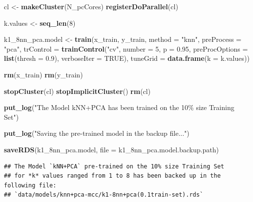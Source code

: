 \documentclass[
]{report}
\newenvironment{Shaded}{\begin{snugshade}}{\end{snugshade}}
\newcommand{\AttributeTok}[1]{\textcolor[rgb]{0.13,0.29,0.53}{#1}}
\newcommand{\ConstantTok}[1]{\textcolor[rgb]{0.56,0.35,0.01}{#1}}
\newcommand{\DecValTok}[1]{\textcolor[rgb]{0.00,0.00,0.81}{#1}}
\newcommand{\FloatTok}[1]{\textcolor[rgb]{0.00,0.00,0.81}{#1}}
\newcommand{\FunctionTok}[1]{\textcolor[rgb]{0.13,0.29,0.53}{\textbf{#1}}}
\newcommand{\NormalTok}[1]{#1}
\newcommand{\OtherTok}[1]{\textcolor[rgb]{0.56,0.35,0.01}{#1}}
\newcommand{\StringTok}[1]{\textcolor[rgb]{0.31,0.60,0.02}{#1}}
\begin{document}
\begin{Shaded}
\begin{Highlighting}[]
\NormalTok{cl }\OtherTok{\textless{}{-}} \FunctionTok{makeCluster}\NormalTok{(N\_pcCores)}
\FunctionTok{registerDoParallel}\NormalTok{(cl)}

\NormalTok{k.values }\OtherTok{\textless{}{-}} \FunctionTok{seq\_len}\NormalTok{(}\DecValTok{8}\NormalTok{)}

\NormalTok{k1\_8nn\_pca.model }\OtherTok{\textless{}{-}} 
  \FunctionTok{train}\NormalTok{(x\_train, }
\NormalTok{        y\_train, }
        \AttributeTok{method =} \StringTok{"knn"}\NormalTok{, }
        \AttributeTok{preProcess =} \StringTok{"pca"}\NormalTok{,}
        \AttributeTok{trControl =} \FunctionTok{trainControl}\NormalTok{(}\StringTok{"cv"}\NormalTok{, }
                                 \AttributeTok{number =} \DecValTok{5}\NormalTok{, }
                                 \AttributeTok{p =} \FloatTok{0.95}\NormalTok{,}
                                 \AttributeTok{preProcOptions =} \FunctionTok{list}\NormalTok{(}\AttributeTok{thresh =} \FloatTok{0.9}\NormalTok{),}
                                 \AttributeTok{verboseIter =} \ConstantTok{TRUE}\NormalTok{),}
        \AttributeTok{tuneGrid =} \FunctionTok{data.frame}\NormalTok{(}\AttributeTok{k =}\NormalTok{ k.values))}

\FunctionTok{rm}\NormalTok{(x\_train)}
\FunctionTok{rm}\NormalTok{(y\_train)}

\FunctionTok{stopCluster}\NormalTok{(cl)}
\FunctionTok{stopImplicitCluster}\NormalTok{()}
\FunctionTok{rm}\NormalTok{(cl)}

\FunctionTok{put\_log}\NormalTok{(}\StringTok{"The Model \textasciigrave{}kNN+PCA\textasciigrave{} has been trained on the 10\% size Training Set"}\NormalTok{)}

\FunctionTok{put\_log}\NormalTok{(}\StringTok{"Saving the pre{-}trained model in the backup file..."}\NormalTok{)}

\FunctionTok{saveRDS}\NormalTok{(k1\_8nn\_pca.model, }
        \AttributeTok{file =}\NormalTok{ k1\_8nn\_pca.model.backup.path)}
\end{Highlighting}
\end{Shaded}

\begin{verbatim}
## The Model `kNN+PCA` pre-trained on the 10% size Training Set 
## for *k* values ranged from 1 to 8 has been backed up in the following file:
## `data/models/knn+pca-mcc/k1-8nn+pca(0.1train-set).rds`
\end{verbatim}
\end{document}
